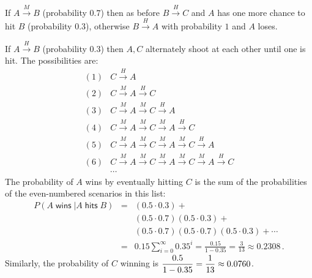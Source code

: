 If $A\stackrel{M}{\longrightarrow}B$ (probability $0.7$) then as before $B\stackrel{H}{\longrightarrow}C$ and $A$ has one more chance to hit $B$ (probability $0.3$), otherwise $B\stackrel{H}{\longrightarrow}A$ with probability $1$ and $A$ loses.

If $A\stackrel{H}{\longrightarrow}B$ (probability $0.3$) then $A,C$ alternately shoot at each other until one is hit. The possibilities are:
\[
\begin{array}{ll}
(1)&C\stackrel{H}{\longrightarrow}A\\
(2)&C\stackrel{M}{\longrightarrow}A \stackrel{H}{\longrightarrow}C\\
(3)&C\stackrel{M}{\longrightarrow}A \stackrel{M}{\longrightarrow}C\stackrel{H}{\longrightarrow}A\\
(4)&C\stackrel{M}{\longrightarrow}A \stackrel{M}{\longrightarrow}C\stackrel{M}{\longrightarrow}A\stackrel{H}{\longrightarrow}C\\
(5)&C\stackrel{M}{\longrightarrow}A \stackrel{M}{\longrightarrow}C\stackrel{M}{\longrightarrow}A\stackrel{M}{\longrightarrow}C\stackrel{H}{\longrightarrow}A\\
(6)&C\stackrel{M}{\longrightarrow}A \stackrel{M}{\longrightarrow}C\stackrel{M}{\longrightarrow}A\stackrel{M}{\longrightarrow}C\stackrel{M}{\longrightarrow}A\stackrel{H}{\longrightarrow}C\\
&\cdots
\end{array}
\]
The probability of $A$ wins by eventually hitting $C$ is the sum of the probabilities of the even-numbered scenarios in this list:
\begin{eqnarray*}
P(A\;\textsf{wins} \;| A\; \textsf{hits}\;B )&=&(0.5 \cdot 0.3) + \\
&&(0.5 \cdot 0.7) (0.5 \cdot 0.3) + \\
&&(0.5 \cdot 0.7) (0.5 \cdot 0.7) (0.5 \cdot 0.3)+ \cdots\\
&=&0.15 \sum_{i=0}^{\infty} 0.35^i= \frac{0.15}{1-0.35}=\frac{3}{13}\approx 0.2308\,.
\end{eqnarray*}
Similarly, the probability of $C$ winning is $\displaystyle\frac{0.5}{1-0.35}=\displaystyle\frac{1}{13}\approx 0.0760$.


